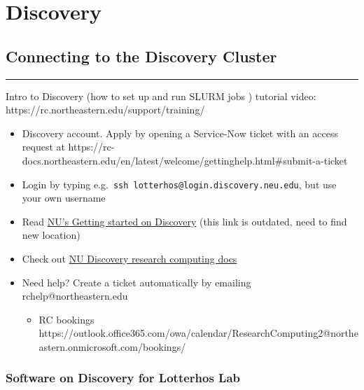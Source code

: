 \documentclass[
  letterpaper,
  DIV=11,
  numbers=noendperiod]{scrreprt}
\providecommand{\tightlist}{%
  \setlength{\itemsep}{0pt}\setlength{\parskip}{0pt}}\usepackage{longtable,booktabs,array}
\begin{document}
\part{Discovery}

\hypertarget{connecting-to-the-discovery-cluster}{%
\chapter{Connecting to the Discovery
Cluster}\label{connecting-to-the-discovery-cluster}}

\begin{center}\rule{0.5\linewidth}{0.5pt}\end{center}

Intro to Discovery (how to set up and run SLURM jobs ) tutorial video:
https://rc.northeastern.edu/support/training/

\begin{itemize}
\item
  Discovery account. Apply by opening a Service-Now ticket with an
  access request at
  https://rc-docs.northeastern.edu/en/latest/welcome/gettinghelp.html\#submit-a-ticket
\item
  Login by typing e.g.~\texttt{ssh\ lotterhos@login.discovery.neu.edu},
  but use your own username
\item
  Read
  \href{https://cpb-us-w2.wpmucdn.com/express.northeastern.edu/dist/1/43/files/2019/08/GettingStartedGuide-1.pdf}{NU's
  Getting started on Discovery} (this link is outdated, need to find new
  location)
\item
  Check out \href{https://rc-docs.northeastern.edu/en/latest/}{NU
  Discovery research computing docs}
\item
  Need help? Create a ticket automatically by emailing
  rchelp@northeastern.edu

  \begin{itemize}
  \tightlist
  \item
    RC bookings
    https://outlook.office365.com/owa/calendar/ResearchComputing2@northeastern.onmicrosoft.com/bookings/
  \end{itemize}
\end{itemize}

\hypertarget{software-on-discovery-for-lotterhos-lab}{%
\section*{\texorpdfstring{\textbf{Software on Discovery for Lotterhos
Lab}}{Software on Discovery for Lotterhos Lab}}\label{software-on-discovery-for-lotterhos-lab}}
\end{document}
